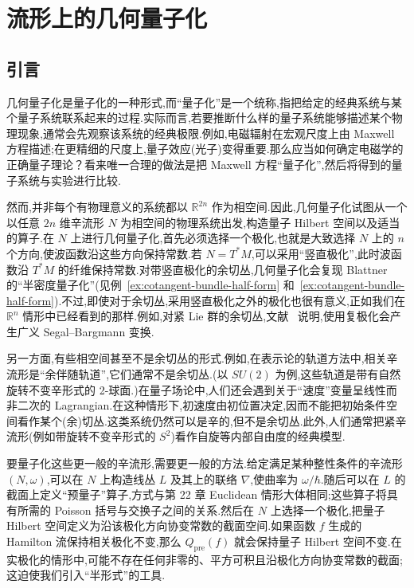 \chapter{流形上的几何量子化}
\label{chap:geometric-quantization-manifolds}

\section{引言}
\label{sec:geometric-quantization-manifolds-intro}

几何量子化是量子化的一种形式,而“量子化”是一个统称,指把给定的经典系统与某个量子系统联系起来的过程.实际而言,若要推断什么样的量子系统能够描述某个物理现象,通常会先观察该系统的经典极限.例如,电磁辐射在宏观尺度上由 Maxwell 方程描述;在更精细的尺度上,量子效应(光子)变得重要.那么应当如何确定电磁学的正确量子理论？看来唯一合理的做法是把 Maxwell 方程“量子化”,然后将得到的量子系统与实验进行比较.

然而,并非每个有物理意义的系统都以 $\mathbb R^{2n}$ 作为相空间.因此,几何量子化试图从一个以任意 $2n$ 维辛流形 $N$ 为相空间的物理系统出发,构造量子 Hilbert 空间以及适当的算子.在 $N$ 上进行几何量子化,首先必须选择一个极化,也就是大致选择 $N$ 上的 $n$ 个方向,使波函数沿这些方向保持常数.若 $N=T^*M$,可以采用“竖直极化”,此时波函数沿 $T^*M$ 的纤维保持常数.对带竖直极化的余切丛,几何量子化会复现 Blattner 的“半密度量子化”(见例~\ref{ex:cotangent-bundle-half-form} 和~\ref{ex:cotangent-bundle-half-form}).不过,即使对于余切丛,采用竖直极化之外的极化也很有意义,正如我们在 $\mathbb R^n$ 情形中已经看到的那样.例如,对紧 Lie 群的余切丛,文献~\cite{Hall2002} 说明,使用复极化会产生广义 Segal--Bargmann 变换.

另一方面,有些相空间甚至不是余切丛的形式.例如,在表示论的轨道方法中,相关辛流形是“余伴随轨道”,它们通常不是余切丛.(以 $SU(2)$ 为例,这些轨道是带有自然旋转不变辛形式的 2-球面.)在量子场论中,人们还会遇到关于“速度”变量呈线性而非二次的 Lagrangian.在这种情形下,初速度由初位置决定,因而不能把初始条件空间看作某个(余)切丛.这类系统仍然可以是辛的,但不是余切丛.此外,人们通常把紧辛流形(例如带旋转不变辛形式的 $S^2$)看作自旋等内部自由度的经典模型.

要量子化这些更一般的辛流形,需要更一般的方法.给定满足某种整性条件的辛流形 $(N,\omega)$,可以在 $N$ 上构造线丛 $L$ 及其上的联络 $\nabla$,使曲率为 $\omega/\hbar$.随后可以在 $L$ 的截面上定义“预量子”算子,方式与第 22 章 Euclidean 情形大体相同;这些算子将具有所需的 Poisson 括号与交换子之间的关系.然后在 $N$ 上选择一个极化,把量子 Hilbert 空间定义为沿该极化方向协变常数的截面空间.如果函数 $f$ 生成的 Hamilton 流保持相关极化不变,那么 $Q_{\mathrm{pre}}(f)$ 就会保持量子 Hilbert 空间不变.在实极化的情形中,可能不存在任何非零的、平方可积且沿极化方向协变常数的截面;这迫使我们引入“半形式”的工具.

